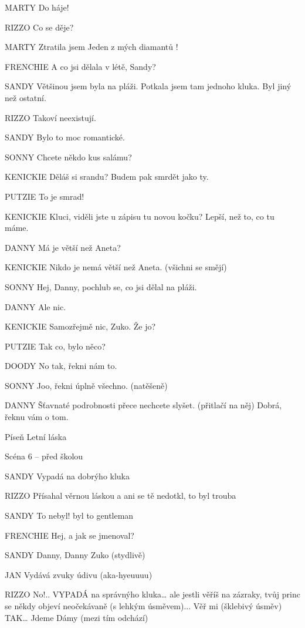 MARTY        Do háje!

RIZZO        Co se děje?

MARTY         Ztratila jsem Jeden z mých diamantů !

FRENCHIE         A co jsi dělala v létě, Sandy?

SANDY        Většinou jsem byla na pláži. Potkala jsem tam jednoho kluka. Byl jiný         než ostatní.

RIZZO        Takoví neexistují.

SANDY        Bylo to moc romantické.





SONNY        Chcete někdo kus salámu?

KENICKIE         Děláš si srandu? Budem pak smrdět jako ty.

PUTZIE         To je smrad!

KENICKIE        Kluci, viděli jste u zápisu tu novou kočku? Lepší, než to, co tu máme.

DANNY        Má je větší než Aneta?

KENICKIE        Nikdo je nemá větší než Aneta. (všichni se smějí)

SONNY        Hej, Danny,  pochlub se, co jsi dělal na pláži. 

DANNY        Ale nic. 

KENICKIE        Samozřejmě nic, Zuko. Že jo?

PUTZIE         Tak co, bylo něco?

DOODY        No tak, řekni nám to.

SONNY         Joo, řekni úplně všechno. (natěšeně)

DANNY        Šťavnaté podrobnosti přece nechcete slyšet. (přitlačí na něj) Dobrá,                 řeknu vám o tom.

Píseň Letní láska 

Scéna 6 – před školou 

SANDY                 Vypadá na dobrýho kluka

RIZZO        Přísahal věrnou láskou a ani se tě nedotkl, to byl trouba

SANDY        To nebyl! byl to gentleman

FRENCHIE        Hej, a jak se jmenoval?

SANDY        Danny, Danny Zuko (stydlivě)

JAN        Vydává zvuky údivu (aka-hyeuuuu)

RIZZO        No!.. VYPADÁ na správnýho kluka… ale jestli věříš na zázraky, tvůj princ         se někdy objeví neočekávaně (s lehkým úsměvem)... Věř mi (šklebivý         úsměv) TAK… Jdeme Dámy (mezi tím odchází)

